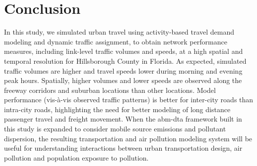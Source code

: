 \section{Conclusion}
In this study, we simulated urban travel using activity-based travel demand modeling and dynamic traffic assignment, to obtain network performance measures, including link-level traffic volumes and speeds, at a high spatial and temporal resolution for Hillsborough County in Florida. 
As expected, simulated traffic volumes are higher and travel speeds lower during morning and evening peak hours. 
Spatially, higher volumes and lower speeds are observed along the freeway corridors and suburban locations than other locations. 
Model performance (vis-à-vis observed traffic patterns) is better for inter-city roads than intra-city roads, highlighting the need for better modeling of long distance passenger travel and freight movement. 
When the \gls{abm}-\gls{dta} framework built in this study is expanded to consider mobile source emissions and pollutant dispersion, the resulting transportation and air pollution modeling system will be useful for understanding interactions between urban transportation design, air pollution and population exposure to pollution.


